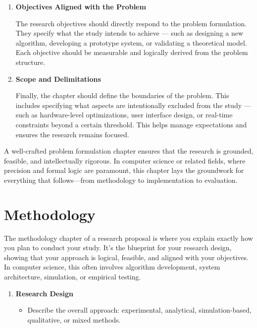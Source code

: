 \documentclass[PCOM,Proposal,Review]{mpThesis}
\newcommand{\Hd}[1]{{\color{SteelBlue}\bf#1}}
\begin{document}
\begin{MainMatter}
\begin{Remark}
\begin{enumerate}
Derived from the formalized problem, this section presents the central research questions or hypotheses.
These guide the investigation and define what the study aims to discover, prove, or develop.
In computer science, these often relate to performance metrics, algorithmic efficiency, system robustness, or theoretical properties.

\item \Hd{Objectives Aligned with the Problem}

The research objectives should directly respond to the problem formulation.
They specify what the study intends to achieve --- such as
designing a new algorithm, developing a prototype system, or validating a theoretical model.
Each objective should be measurable and logically derived from the problem structure.

\item \Hd{Scope and Delimitations}

Finally, the chapter should define the boundaries of the problem.
This includes specifying what aspects are intentionally excluded from the study --- such as
hardware-level optimizations, user interface design, or real-time constraints beyond a certain threshold.
This helps manage expectations and ensures the research remains focused.
\end{enumerate}

A well-crafted problem formulation chapter ensures that the research is grounded, feasible, and intellectually rigorous. In computer science or related fields, where precision and formal logic are paramount, this chapter lays the groundwork for everything that follows—from methodology to implementation to evaluation.
\end{Remark}

\chapter{Methodology}
\label{ch:method}
\minitoc

\begin{Remark}
The methodology chapter of a research proposal is where you explain exactly how you plan to conduct your study. It’s the blueprint for your research design, showing that your approach is logical, feasible, and aligned with your objectives. In computer science, this often involves algorithm development, system architecture, simulation, or empirical testing.
\begin{enumerate}
\item \Hd{Research Design}
  \begin{itemize}
  \item Describe the overall approach: experimental, analytical, simulation-based, qualitative, or mixed methods.


\end{itemize}
\end{enumerate}
\end{Remark}
\end{MainMatter}
\end{document}
